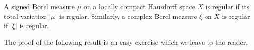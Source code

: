 A signed Borel measure $\mu$ on a locally compact Hausdorff space $X$ is regular if its total variation $|\mu|$ is regular. Similarly, a complex Borel measure $\xi$ on $X$ is regular if $|\xi|$ is regular.

The proof of the following result is an easy exercise which we leave to the reader.
